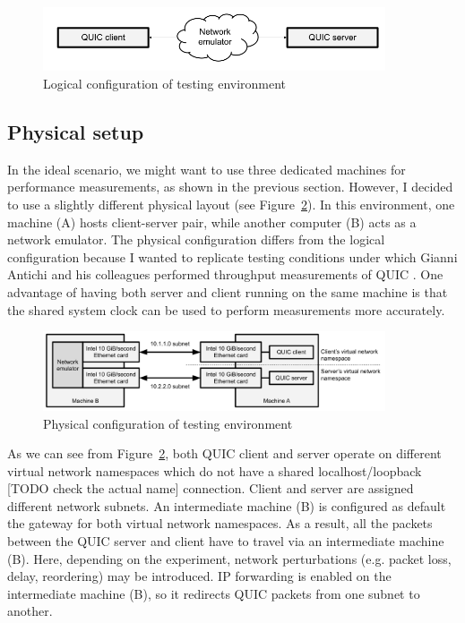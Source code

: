 \documentclass[12pt,a4paper,twoside,openright]{report}
\begin{document}
    \begin{figure}[h]
    \centering
    \includegraphics[width=0.9\textwidth]{figs/Logical_testing_environment.png}
    \caption{Logical configuration of testing environment}
    \label{fig:Logical_testing_environment}
    \end{figure}

\subsection{Physical setup}
    In the ideal scenario, we might want to use three dedicated machines for performance measurements, as shown in the previous section.
    However, I decided to use a slightly different physical layout (see Figure~\ref{fig:Physical_testing_environment}).
    In this environment, one machine (A) hosts client-server pair, while another computer (B) acts as a network emulator.
    The physical configuration differs from the logical configuration because I wanted to replicate testing conditions under which Gianni Antichi and his colleagues performed throughput measurements of QUIC \cite{Making_QUIC_Quicker}.
    One advantage of having both server and client running on the same machine is that the shared system clock can be used to perform measurements more accurately. 
    
    \begin{figure}[ht]
    \centering
    \includegraphics[width=0.9\textwidth]{figs/Physical_testing_environment.png}
    \caption{Physical configuration of testing environment}
    \label{fig:Physical_testing_environment}
    \end{figure}
    
    As we can see from Figure~\ref{fig:Physical_testing_environment}, both QUIC client and server operate on different virtual network namespaces which do not have a shared localhost/loopback [TODO check the actual name] connection.
    Client and server are assigned different network subnets.
    An intermediate machine (B) is configured as default the gateway for both virtual network namespaces.
    As a result, all the packets between the QUIC server and client have to travel via an intermediate machine (B).
    Here, depending on the experiment, network perturbations (e.g. packet loss, delay, reordering) may be introduced.
    IP forwarding is enabled on the intermediate machine (B), so it redirects QUIC packets from one subnet to another.
\end{document}
